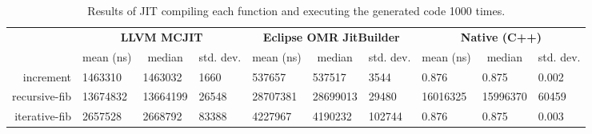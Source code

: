 \begin{table*}[t]
  \begin{tabular}{|r|l|l|l|l|l|l|l|l|l|}
  \hline
  
  \multicolumn{1}{|l|}{\multirow{2}{*}{}} 
  & \multicolumn{3}{c|}{\textbf{LLVM MCJIT}}                                                                                    
  & \multicolumn{3}{c|}{\textbf{Eclipse OMR JitBuilder}}                                                                
  & \multicolumn{3}{c|}{\textbf{Native (C++)}}                                                                              
  \\ \cline{2-10}
  
  \multicolumn{1}{|c|}{\textbf{Program}}  
  & \multicolumn{1}{c|}{mean (ns)}  %
  & \multicolumn{1}{c|}{median}  
  & \multicolumn{1}{c|}{std. dev.}                     
  & \multicolumn{1}{c|}{mean (ns)}  %
  & \multicolumn{1}{c|}{median}  
  & \multicolumn{1}{c|}{std. dev.}           
  & \multicolumn{1}{c|}{mean (ns)}  %
  & \multicolumn{1}{c|}{median}  
  & \multicolumn{1}{c|}{std. dev.}                        
  \\ \hline
  
  increment                               
  & \num{1463310} %
  & \num{1463032}                
  & \num{1660}                                        
  & \num{537657}  %
  & \num{537517}                 
  & \num{3544}                                
  & \num{0.876}    %
  & \num{0.875}                   
  & \num{0.002}                                
  \\ \hline
  
  recursive-fib                           
  & \num{13674832}  %
  & \num{13664199}               
  & \num{26548}                                        
  & \num{28707381}  %
  & \num{28699013}               
  & \num{29480}                               
  & \num{16016325}  %
  & \num{15996370}               
  & \num{60459}  
  \\ \hline
  
  iterative-fib                           
  & \num{2657528}   %
  & \num{2668792}                
  & \num{83388}                                        
  & \num{4227967}   %
  & \num{4190232}                
  & \num{102744}                              
  & \num{0.876}     %
  & \num{0.875}                  
  & \num{0.003}                                
  \\ \hline
  \end{tabular}
  \caption{Results of JIT compiling each function and executing the generated code 1000 times.}
  \label{tab:1k_time}
\end{table*}

